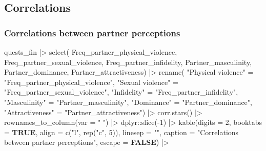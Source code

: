 \documentclass[
  bookmarksnumbered]{article}
\newenvironment{Shaded}{\begin{snugshade}}{\end{snugshade}}
\newcommand{\AttributeTok}[1]{\textcolor[rgb]{0.80,0.80,0.80}{#1}}
\newcommand{\ConstantTok}[1]{\textcolor[rgb]{0.86,0.64,0.64}{\textbf{#1}}}
\newcommand{\DecValTok}[1]{\textcolor[rgb]{0.86,0.86,0.80}{#1}}
\newcommand{\FunctionTok}[1]{\textcolor[rgb]{0.94,0.94,0.56}{#1}}
\newcommand{\NormalTok}[1]{\textcolor[rgb]{0.80,0.80,0.80}{#1}}
\newcommand{\OtherTok}[1]{\textcolor[rgb]{0.94,0.94,0.56}{#1}}
\newcommand{\SpecialCharTok}[1]{\textcolor[rgb]{0.86,0.64,0.64}{#1}}
\newcommand{\StringTok}[1]{\textcolor[rgb]{0.80,0.58,0.58}{#1}}
\begin{document}
\subsection{Correlations}\label{correlations}

\subsubsection{Correlations between partner perceptions}\label{correlations-between-partner-perceptions}

\begin{Shaded}
\begin{Highlighting}[]
\NormalTok{quests\_fin }\SpecialCharTok{|\textgreater{}}
  \FunctionTok{select}\NormalTok{(}
\NormalTok{    Freq\_partner\_physical\_violence,}
\NormalTok{    Freq\_partner\_sexual\_violence,}
\NormalTok{    Freq\_partner\_infidelity,}
\NormalTok{    Partner\_masculinity,}
\NormalTok{    Partner\_dominance,}
\NormalTok{    Partner\_attractiveness) }\SpecialCharTok{|\textgreater{}}
  \FunctionTok{rename}\NormalTok{(}
    \StringTok{"Physical violence"} \OtherTok{=} \StringTok{"Freq\_partner\_physical\_violence"}\NormalTok{,}
    \StringTok{"Sexual violence"} \OtherTok{=} \StringTok{"Freq\_partner\_sexual\_violence"}\NormalTok{,}
    \StringTok{"Infidelity"} \OtherTok{=} \StringTok{"Freq\_partner\_infidelity"}\NormalTok{,}
    \StringTok{"Masculinity"} \OtherTok{=} \StringTok{"Partner\_masculinity"}\NormalTok{,}
    \StringTok{"Dominance"} \OtherTok{=} \StringTok{"Partner\_dominance"}\NormalTok{,}
    \StringTok{"Attractiveness"} \OtherTok{=} \StringTok{"Partner\_attractiveness"}\NormalTok{) }\SpecialCharTok{|\textgreater{}} 
  \FunctionTok{corr.stars}\NormalTok{() }\SpecialCharTok{|\textgreater{}}
  \FunctionTok{rownames\_to\_column}\NormalTok{(}\AttributeTok{var =} \StringTok{" "}\NormalTok{) }\SpecialCharTok{|\textgreater{}} 
\NormalTok{  dplyr}\SpecialCharTok{::}\FunctionTok{slice}\NormalTok{(}\SpecialCharTok{{-}}\DecValTok{1}\NormalTok{) }\SpecialCharTok{|\textgreater{}} 
  \FunctionTok{kable}\NormalTok{(}\AttributeTok{digits =} \DecValTok{2}\NormalTok{,}
        \AttributeTok{booktabs =} \ConstantTok{TRUE}\NormalTok{,}
        \AttributeTok{align =} \FunctionTok{c}\NormalTok{(}\StringTok{"l"}\NormalTok{, }\FunctionTok{rep}\NormalTok{(}\StringTok{"c"}\NormalTok{, }\DecValTok{5}\NormalTok{)),}
        \AttributeTok{linesep =} \StringTok{""}\NormalTok{,}
        \AttributeTok{caption =} \StringTok{"Correlations between partner perceptions"}\NormalTok{,}
        \AttributeTok{escape =} \ConstantTok{FALSE}\NormalTok{) }\SpecialCharTok{|\textgreater{}}

\end{Highlighting}
\end{Shaded}
\end{document}
